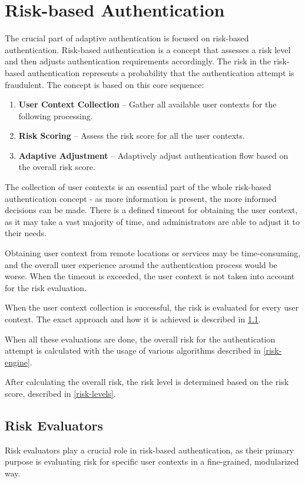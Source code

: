 \section{Risk-based Authentication}
The crucial part of adaptive authentication is focused on risk-based authentication.
Risk-based authentication is a concept that assesses a risk level and then adjusts authentication requirements accordingly.
The risk in the risk-based authentication represents a probability that the authentication attempt is fraudulent.
\newline
\newline
The concept is based on this core sequence:
\begin{enumerate}
    \item \textbf{User Context Collection} -- Gather all available user contexts for the following processing. 
    \item \textbf{Risk Scoring} -- Assess the risk score for all the user contexts. 
    \item \textbf{Adaptive Adjustment} -- Adaptively adjust authentication flow based on the overall risk score.
\end{enumerate}

The collection of user contexts is an essential part of the whole risk-based authentication concept - as more information is present, the more informed decisions can be made.
There is a defined timeout for obtaining the user context, as it may take a vast majority of time, and administrators are able to adjust it to their needs.

Obtaining user context from remote locations or services may be time-consuming, and the overall user experience around the authentication process would be worse.
When the timeout is exceeded, the user context is not taken into account for the risk evaluation.

When the user context collection is successful, the risk is evaluated for every user context.
The exact approach and how it is achieved is described in \ref{risk-evaluators}.

When all these evaluations are done, the overall risk for the authentication attempt is calculated with the usage of various algorithms described in \ref{risk-engine}.

After calculating the overall risk, the risk level is determined based on the risk score, described in \ref{risk-levels}.

\newpage
\subsection{Risk Evaluators} \label{risk-evaluators}
Risk evaluators play a crucial role in risk-based authentication, as their primary purpose is evaluating risk for specific user contexts in a fine-grained, modularized way.

